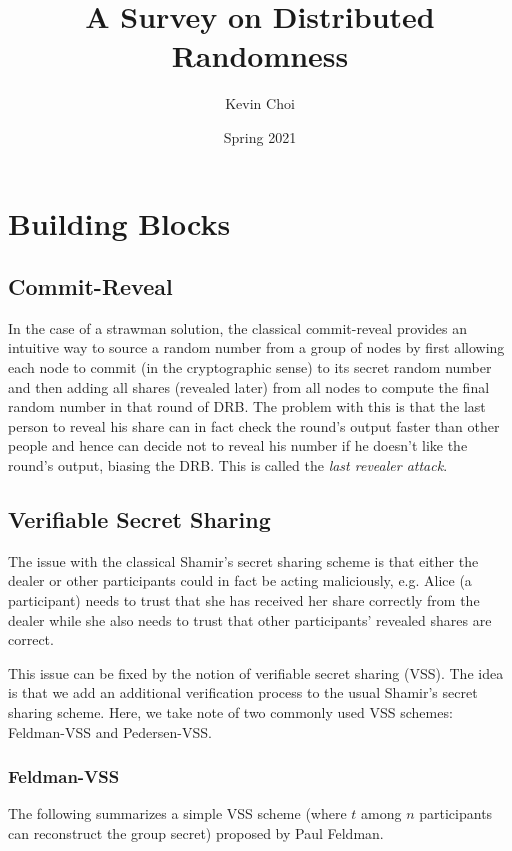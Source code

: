 \documentclass[11pt]{article}
\title{A Survey on Distributed Randomness}
\author{Kevin Choi}
\date{Spring 2021}
\theoremstyle{definition}
\theoremstyle{remark}
\begin{document}
\maketitle
\tableofcontents
\pagebreak

\section{Building Blocks}
\subsection{Commit-Reveal}
In the case of a strawman solution, the classical commit-reveal provides an intuitive way to source a random number from a group of nodes by first allowing each node to commit (in the cryptographic sense) to its secret random number and then adding all shares (revealed later) from all nodes to compute the final random number in that round of DRB. The problem with this is that the last person to reveal his share can in fact check the round's output faster than other people and hence can decide not to reveal his number if he doesn't like the round's output, biasing the DRB. This is called the \textit{last revealer attack}.

\subsection{Verifiable Secret Sharing}
The issue with the classical Shamir's secret sharing scheme is that either the dealer or other participants could in fact be acting maliciously, e.g. Alice (a participant) needs to trust that she has received her share correctly from the dealer while she also needs to trust that other participants' revealed shares are correct.

This issue can be fixed by the notion of verifiable secret sharing (VSS). The idea is that we add an additional verification process to the usual Shamir's secret sharing scheme. Here, we take note of two commonly used VSS schemes: Feldman-VSS and Pedersen-VSS.

\subsubsection{Feldman-VSS}
The following summarizes a simple VSS scheme (where $t$ among $n$ participants can reconstruct the group secret) proposed by Paul Feldman.
\end{document}
